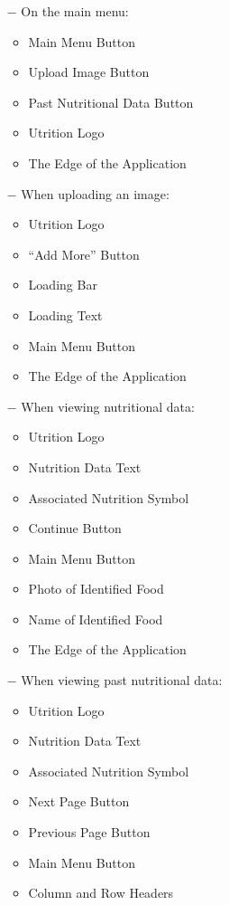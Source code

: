 \documentclass[12pt, titlepage]{article}
\begin{document}
\begin{enumerate}
		\begin{enumerate}
			\item[$-$] On the main menu:
			\begin{itemize}
				\item Main Menu Button
				\item Upload Image Button
				\item Past Nutritional Data Button
				\item Utrition Logo
				\item The Edge of the Application
			\end{itemize}
			\item[$-$] When uploading an image:
			\begin{itemize}
				\item Utrition Logo
				\item “Add More” Button
				\item Loading Bar
				\item Loading Text
				\item Main Menu Button
				\item The Edge of the Application	
			\end{itemize}
			\item[$-$] When viewing nutritional data:
			\begin{itemize}
				\item Utrition Logo
				\item Nutrition Data Text
				\item Associated Nutrition Symbol
				\item Continue Button
				\item Main Menu Button
				\item Photo of Identified Food
				\item Name of Identified Food
				\item The Edge of the Application	
			\end{itemize}
			\item[$-$] When viewing past nutritional data:
			\begin{itemize}
				\item Utrition Logo
				\item Nutrition Data Text
				\item Associated Nutrition Symbol
				\item Next Page Button
				\item Previous Page Button
				\item Main Menu Button
				\item Column and Row Headers

\end{itemize}
\end{enumerate}
\end{enumerate}
\end{document}
